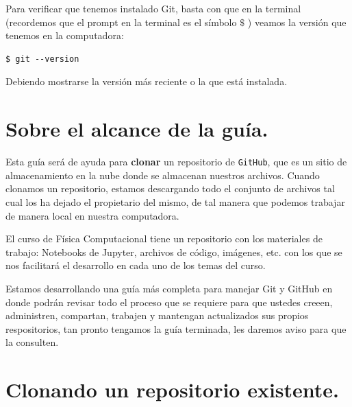 Para verificar que tenemos instalado Git, basta con que en la terminal (recordemos que el prompt en la terminal es el símbolo $\$$ ) veamos la versión que tenemos en la computadora:
\begin{verbatim}
$ git --version
\end{verbatim}
Debiendo mostrarse la versión más reciente o la que está instalada.

\section{Sobre el alcance de la guía.}

Esta guía será de ayuda para \textbf{clonar} un repositorio de \texttt{GitHub}, que es un sitio de almacenamiento en la nube donde se almacenan nuestros archivos. Cuando clonamos un repositorio, estamos descargando todo el conjunto de archivos tal cual los ha dejado el propietario del mismo, de tal manera que podemos trabajar de manera local en nuestra computadora.
\par
El curso de Física Computacional tiene un repositorio con los materiales de trabajo: Notebooks de Jupyter, archivos de código, imágenes, etc. con los que se nos facilitará el desarrollo en cada uno de los temas del curso.
\par
Estamos desarrollando una guía más completa para manejar Git y GitHub en donde podrán revisar todo el proceso que se requiere para que ustedes creeen, administren, compartan, trabajen y mantengan actualizados sus propios respositorios, tan pronto tengamos la guía terminada, les daremos aviso para que la consulten.

\section{Clonando un repositorio existente.}

